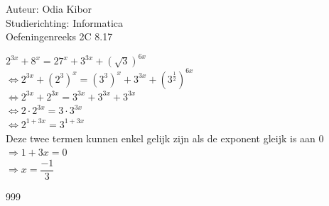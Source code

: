 \documentclass[a4paper]{article}
\begin{document}
  
\noindent \large Auteur: Odia Kibor \\
\noindent \large Studierichting: Informatica\\
\noindent \large Oefeningenreeks 2C 8.17 \\

\medskip

\normalsize

$2^{3x} + 8^{x} = 27^{x} + 3^{3x} + \left(\sqrt{3}\right)^{6x}$ \\

$\Leftrightarrow 2^{3x} + \left(2^{3}\right)^{x} = \left(3^{3}\right)^{x} + 3^{3x} + \left(3^{\frac{1}{2}}\right)^{6x}$ \\

$\Leftrightarrow 2^{3x} + 2^{3x} = 3^{3x} + 3^{3x} + 3^{3x}$ \\

$\Leftrightarrow 2 \cdot 2^{3x} = 3 \cdot 3^{3x}$ \\

$\Leftrightarrow 2^{1+3x} = 3^{1+3x}$ \\

Deze twee termen kunnen enkel gelijk zijn als de exponent gleijk is aan $0$ \\

$\Rightarrow 1 + 3x = 0$ \\

$\Rightarrow x = \dfrac{-1}{3}$ \\


\begin{thebibliography}{999}
\end{thebibliography}
\end{document}
